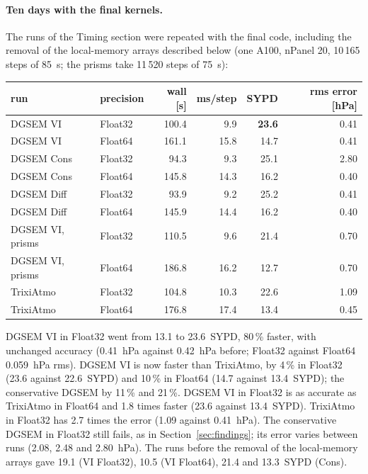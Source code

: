 \documentclass[11pt,a4paper]{article}
\begin{document}
\paragraph{Ten days with the final kernels.} The runs of the Timing
section were repeated with the final code, including the removal of the
local-memory arrays described below (one A100, nPanel 20, 10\,165 steps
of 85~s; the prisms take 11\,520 steps of 75~s):
\begin{center}
\small
\begin{tabular}{llrrrr}
\toprule
run & precision & wall [s] & ms/step & SYPD & rms error [hPa] \\
\midrule
DGSEM VI       & Float32 & 100.4 & 9.9  & \textbf{23.6} & 0.41 \\
DGSEM VI       & Float64 & 161.1 & 15.8 & 14.7 & 0.41 \\
DGSEM Cons     & Float32 &  94.3 & 9.3  & 25.1 & 2.80 \\
DGSEM Cons     & Float64 & 145.8 & 14.3 & 16.2 & 0.40 \\
DGSEM Diff     & Float32 &  93.9 & 9.2  & 25.2 & 0.41 \\
DGSEM Diff     & Float64 & 145.9 & 14.4 & 16.2 & 0.40 \\
DGSEM VI, prisms & Float32 & 110.5 & 9.6  & 21.4 & 0.70 \\
DGSEM VI, prisms & Float64 & 186.8 & 16.2 & 12.7 & 0.70 \\
\midrule
TrixiAtmo      & Float32 & 104.8 & 10.3 & 22.6 & 1.09 \\
TrixiAtmo      & Float64 & 176.8 & 17.4 & 13.4 & 0.45 \\
\bottomrule
\end{tabular}
\end{center}
DGSEM VI in Float32 went from 13.1 to 23.6~SYPD, 80\,\% faster, with
unchanged accuracy (0.41~hPa against 0.42~hPa before; Float32 against
Float64 0.059~hPa rms). DGSEM VI is now faster than TrixiAtmo, by 4\,\%
in Float32 (23.6 against 22.6~SYPD) and 10\,\% in Float64 (14.7 against
13.4~SYPD); the conservative DGSEM by 11\,\% and 21\,\%. DGSEM VI in
Float32 is as accurate as TrixiAtmo in Float64 and 1.8 times faster
(23.6 against 13.4~SYPD). TrixiAtmo in Float32 has 2.7 times the error
(1.09 against 0.41~hPa). The conservative DGSEM in Float32 still fails,
as in Section~\ref{sec:findings}; its error varies between runs (2.08,
2.48 and 2.80~hPa). The runs before the removal of the local-memory
arrays gave 19.1 (VI Float32), 10.5 (VI Float64), 21.4 and 13.3~SYPD
(Cons).
\end{document}
